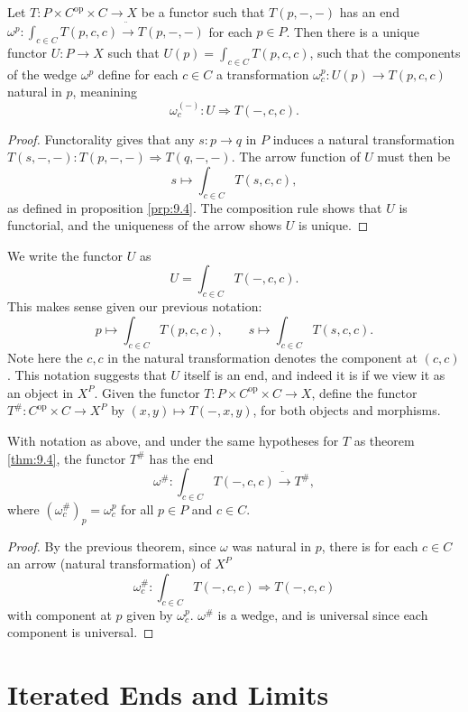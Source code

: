 \begin{theorem}\label{thm:9.4}
	Let $T : P\times C^{\mathrm{op}} \times C \to X$ be a functor such that $T(p,-,-)$ has an end $\omega^p: \int_{c\in C} T(p,c,c) \ddot{\to} T(p,-,-)$ for each $p\in P$. Then there is a unique functor $U : P \to X$ such that $U(p)=\int_{c\in C} T(p,c,c)$, such that the components of the wedge $\omega^p$ define for each $c\in C$ a transformation $\omega_c^p : U(p) \to T(p,c,c)$ natural in $p$, meanining
	\[
		\omega_c^{(-)} : U \Rightarrow T(-,c,c)
	.\]
\end{theorem}
\begin{proof}
	Functorality gives that any $s : p \to q$ in $P$ induces a natural transformation $T(s,-,-): T(p,-,-) \Rightarrow T(q,-,-)$. The arrow function of $U$ must then be
\[s\mapsto \int_{c\in C} T(s,c,c),\]
as defined in proposition \ref{prp:9.4}. The composition rule shows that $U$ is functorial, and the uniqueness of the arrow shows $U$ is unique.
\end{proof}

We write the functor $U$ as
\[
	U=\int_{c\in C} T(-,c,c)
.\]
This makes sense given our previous notation:
\[
	p\mapsto \int_{c\in C} T(p,c,c),\qquad s\mapsto \int_{c\in C} T(s,c,c)
.\]
Note here the $c,c$ in the natural transformation denotes the component at $(c,c)$. This notation suggests that $U$ itself is an end, and indeed it is if we view it as an object in $X^P$. Given the functor $T : P\times C^{\mathrm{op}} \times C \to X$, define the functor $T^\# : C^{\mathrm{op}} \times C \to X^P$ by $(x,y)\mapsto T(-,x,y)$, for both objects and morphisms.
\begin{theorem}\label{thm:9.5}
	With notation as above, and under the same hypotheses for $T$ as theorem \ref{thm:9.4}, the functor $T^\#$ has the end
	\[
		\omega^\# : \int_{c\in C} T(-,c,c) \ddot{\to} T^\#,
	\]
	where $(\omega^\#_c)_p=\omega_c^p$ for all $p\in P$ and $c\in C$.
\end{theorem}
\begin{proof}
	By the previous theorem, since $\omega$ was natural in $p$, there is for each $c\in C$ an arrow (natural transformation) of $X^P$
	\[
		\omega^\#_c : \int_{c\in C} T(-,c,c) \Rightarrow T(-,c,c)
	\]
	with component at $p$ given by $\omega_c^p$. $\omega^\#$ is a wedge, and is universal since each component is universal.
\end{proof}

\section{Iterated Ends and Limits}

